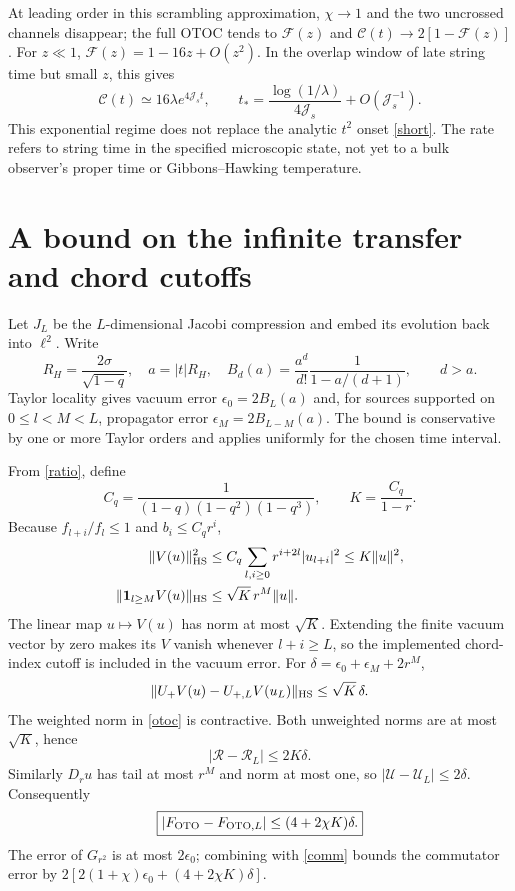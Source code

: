 \documentclass[11pt,a4paper]{article}
\newcommand{\Js}{\mathcal J_s}
\begin{document}
At leading order in this scrambling approximation, $\chi\to1$
and the two uncrossed channels disappear;
the full OTOC tends to $\mathcal F(z)$ and
$\mathcal C(t)\to2[1-\mathcal F(z)]$.
For $z\ll1$, $\mathcal F(z)=1-16z+O(z^2)$. In the overlap window of
late string time but small $z$, this gives
\begin{equation}
 \mathcal C(t)\simeq16\lambda e^{4\Js t},\qquad
 t_* = \frac{\log(1/\lambda)}{4\Js}+O(\Js^{-1}).
\end{equation}
This exponential regime does not replace the analytic $t^2$ onset
\eqref{short}. The rate refers to string time in the specified microscopic
state, not yet to a bulk observer's proper time or Gibbons--Hawking temperature.

\newpage\appendix
\section{A bound on the infinite transfer and chord cutoffs}
Let $J_L$ be the $L$-dimensional Jacobi compression and embed its
evolution back into $\ell^2$. Write
\begin{equation}
 R_H=\frac{2\sigma}{\sqrt{1-q}},\quad a=|t|R_H,\quad
 B_d(a)=\frac{a^d}{d!}\frac1{1-a/(d+1)},\qquad d>a.
\end{equation}
Taylor locality gives vacuum error $\epsilon_0=2B_L(a)$ and,
for sources supported on $0\le l<M<L$, propagator error
$\epsilon_M=2B_{L-M}(a)$. The bound is conservative by one or more
Taylor orders and applies uniformly for the chosen time interval.

From \eqref{ratio}, define
\begin{equation}
 C_q=\frac1{(1-q)(1-q^2)(1-q^3)},\qquad K=\frac{C_q}{1-r}.
\end{equation}
Because $f_{l+i}/f_l\le1$ and $b_i\le C_qr^i$,
\begin{align}
 \|V(u)\|_{\rm HS}^2
 &\le C_q\sum_{l,i\ge0}r^{i+2l}|u_{l+i}|^2\le K\|u\|^2,\\
 \|\mathbf1_{l\ge M}V(u)\|_{\rm HS}&\le\sqrt K\,r^M\|u\|.
\end{align}
The linear map $u\mapsto V(u)$ has norm at most $\sqrt K$.
Extending the finite vacuum vector by zero makes its $V$ vanish whenever
$l+i\ge L$, so the implemented chord-index cutoff is included in the
vacuum error. For $\delta=\epsilon_0+\epsilon_M+2r^M$,
\begin{equation}
 \|U_+V(u)-U_{+,L}V(u_L)\|_{\rm HS}\le\sqrt K\,\delta.
\end{equation}
The weighted norm in \eqref{otoc} is contractive. Both unweighted norms
are at most $\sqrt K$, hence
\begin{equation}
 |\mathcal R-\mathcal R_L|\le2K\delta.
\end{equation}
Similarly $D_ru$ has tail at most $r^M$ and norm at most one, so
$|\mathcal U-\mathcal U_L|\le2\delta$. Consequently
\begin{equation}\boxed{
 |F_{\rm OTO}-F_{{\rm OTO},L}|
 \le(4+2\chi K)\delta.}\label{bound}
\end{equation}
The error of $G_{r^2}$ is at most $2\epsilon_0$; combining with
\eqref{comm} bounds the commutator error by
$2[2(1+\chi)\epsilon_0+(4+2\chi K)\delta]$.
\end{document}
